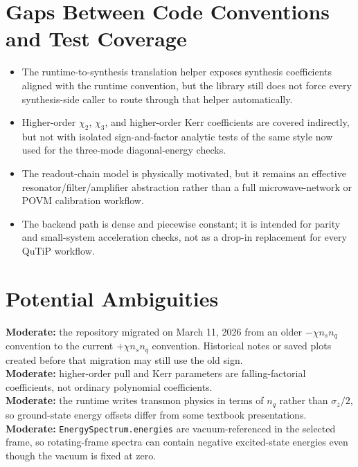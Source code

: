 \documentclass[11pt]{article}
\begin{document}
\section{Gaps Between Code Conventions and Test Coverage}
\begin{itemize}[leftmargin=1.5em]
  \item The runtime-to-synthesis translation helper exposes synthesis coefficients
  aligned with the runtime convention, but the library still does not force every
  synthesis-side caller to route through that helper automatically.
  \item Higher-order \(\chi_2\), \(\chi_3\), and higher-order Kerr coefficients are
  covered indirectly, but not with isolated sign-and-factor analytic tests of the
  same style now used for the three-mode diagonal-energy checks.
  \item The readout-chain model is physically motivated, but it remains an effective
  resonator/filter/amplifier abstraction rather than a full microwave-network or POVM calibration workflow.
  \item The backend path is dense and piecewise constant; it is intended for parity
  and small-system acceleration checks, not as a drop-in replacement for every QuTiP workflow.
\end{itemize}

\section{Potential Ambiguities}
\textbf{Moderate:} the repository migrated on March 11, 2026 from an older
\(-\chi n_s n_q\) convention to the current \(+\chi n_s n_q\) convention.
Historical notes or saved plots created before that migration may still use the old sign.\\

\textbf{Moderate:} higher-order pull and Kerr parameters are falling-factorial
coefficients, not ordinary polynomial coefficients.\\

\textbf{Moderate:} the runtime writes transmon physics in terms of \(n_q\) rather
than \(\sigma_z/2\), so ground-state energy offsets differ from some textbook presentations.\\

\textbf{Moderate:} \texttt{EnergySpectrum.energies} are vacuum-referenced in the
selected frame, so rotating-frame spectra can contain negative excited-state energies
even though the vacuum is fixed at zero.\\
\end{document}
